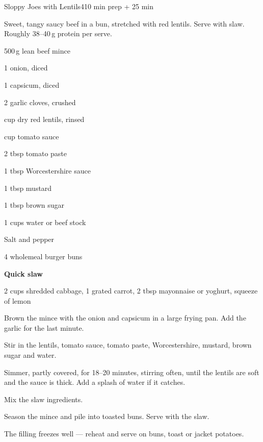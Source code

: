 \begin{recipebox}{Sloppy Joes with Lentils}{4}{10 min prep + 25 min}

Sweet, tangy saucy beef in a bun, stretched with red lentils. Serve with slaw.
Roughly 38--40\,g protein per serve.

\begin{ingredients}
  \item 500\,g lean beef mince
  \item 1 onion, diced
  \item 1 capsicum, diced
  \item 2 garlic cloves, crushed
  \item {} cup dry red lentils, rinsed
  \item {} cup tomato sauce
  \item 2 tbsp tomato paste
  \item 1 tbsp Worcestershire sauce
  \item 1 tbsp mustard
  \item 1 tbsp brown sugar
  \item 1 cups water or beef stock
  \item Salt and pepper
  \item 4 wholemeal burger buns
  \item[] \textbf{Quick slaw}
  \item 2 cups shredded cabbage, 1 grated carrot, 2 tbsp mayonnaise or yoghurt, squeeze of lemon
\end{ingredients}

\begin{method}
  \item Brown the mince with the onion and capsicum in a large frying pan. Add the garlic for the last minute.
  \item Stir in the lentils, tomato sauce, tomato paste, Worcestershire, mustard, brown sugar and water.
  \item Simmer, partly covered, for 18--20 minutes, stirring often, until the lentils are soft and the sauce is thick. Add a splash of water if it catches.
  \item Mix the slaw ingredients.
  \item Season the mince and pile into toasted buns. Serve with the slaw.
\end{method}

\begin{notelist}
  \item The filling freezes well --- reheat and serve on buns, toast or jacket potatoes.
\end{notelist}

\end{recipebox}
